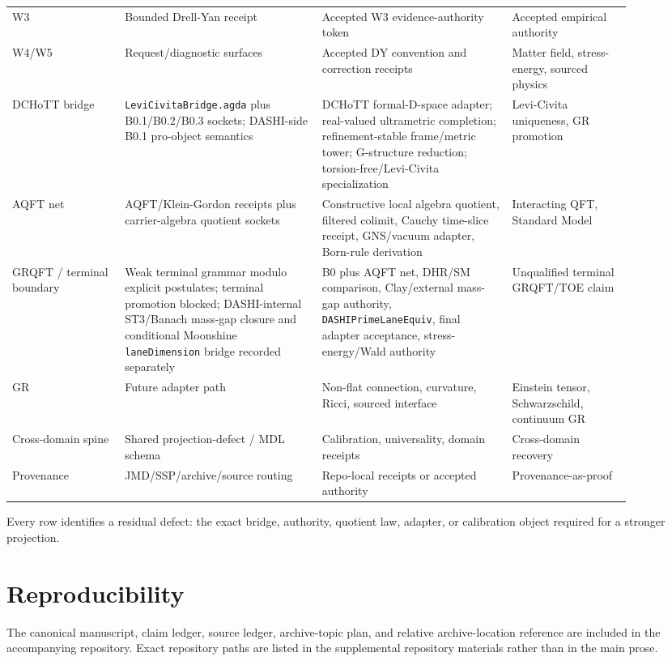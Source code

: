 \documentclass[11pt]{article}
\theoremstyle{definition}
\theoremstyle{plain}
\theoremstyle{remark}
\begin{document}
\begin{longtable}{p{0.16\linewidth}p{0.29\linewidth}p{0.27\linewidth}p{0.17\linewidth}}
W3 & Bounded Drell-Yan receipt & Accepted W3 evidence-authority token & Accepted empirical authority \\
W4/W5 & Request/diagnostic surfaces & Accepted DY convention and correction receipts & Matter field, stress-energy, sourced physics \\
DCHoTT bridge & \texttt{LeviCivitaBridge.agda} plus B0.1/B0.2/B0.3 sockets; DASHI-side B0.1 pro-object semantics & DCHoTT formal-D-space adapter; real-valued ultrametric completion; refinement-stable frame/metric tower; G-structure reduction; torsion-free/Levi-Civita specialization & Levi-Civita uniqueness, GR promotion \\
AQFT net & AQFT/Klein-Gordon receipts plus carrier-algebra quotient sockets & Constructive local algebra quotient, filtered colimit, Cauchy time-slice receipt, GNS/vacuum adapter, Born-rule derivation & Interacting QFT, Standard Model \\
GRQFT / terminal boundary & Weak terminal grammar modulo explicit postulates; terminal promotion blocked; DASHI-internal ST3/Banach mass-gap closure and conditional Moonshine \texttt{laneDimension} bridge recorded separately & B0 plus AQFT net, DHR/SM comparison, Clay/external mass-gap authority, \texttt{DASHIPrimeLaneEquiv}, final adapter acceptance, stress-energy/Wald authority & Unqualified terminal GRQFT/TOE claim \\
GR & Future adapter path & Non-flat connection, curvature, Ricci, sourced interface & Einstein tensor, Schwarzschild, continuum GR \\
Cross-domain spine & Shared projection-defect / MDL schema & Calibration, universality, domain receipts & Cross-domain recovery \\
Provenance & JMD/SSP/archive/source routing & Repo-local receipts or accepted authority & Provenance-as-proof \\
\bottomrule
\end{longtable}

Every row identifies a residual defect: the exact bridge, authority, quotient
law, adapter, or calibration object required for a stronger projection.


\section{Reproducibility}

The canonical manuscript, claim ledger, source ledger, archive-topic plan, and
relative archive-location reference are included in the accompanying
repository. Exact repository paths are listed in the supplemental repository
materials rather than in the main prose.
\end{document}

